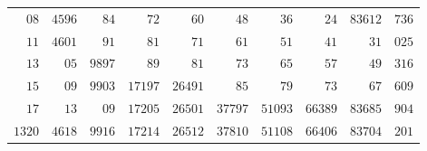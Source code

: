 \begin{longtable}{@{}r|r|r|r|r|r|r|r|r|r@{}}
$08$ & $4596$ & $84$ & $72$ & $60$ & $48$ & $36$ & $24$ & $83612$ & $736$\\
$11$ & $4601$ & $91$ & $81$ & $71$ & $61$ & $51$ & $41$ & $31$ & $025$\\
$13$ & $05$ & $9897$ & $89$ & $81$ & $73$ & $65$ & $57$ & $49$ & $316$\\
$15$ & $09$ & $9903$ & $17197$ & $26491$ & $85$ & $79$ & $73$ & $67$ & $609$\\
$17$ & $13$ & $09$ & $17205$ & $26501$ & $37797$ & $51093$ & $66389$ & $83685$ & $904$\\
$1320$ & $4618$ & $9916$ & $17214$ & $26512$ & $37810$ & $51108$ & $66406$ & $83704$ & $201$\\
\hline\end{longtable}\endgroup
